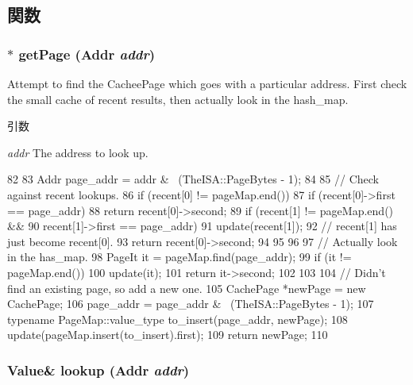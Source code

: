 \subsection{関数}
\hypertarget{classDecodeCache_1_1AddrMap_a5eb5de403aecd89f1133b26ad171f51c}{
\subsubsection[{getPage}]{$\ast$ getPage ({\bf Addr} {\em addr})}}
\label{classDecodeCache_1_1AddrMap_a5eb5de403aecd89f1133b26ad171f51c}
Attempt to find the CacheePage which goes with a particular address. First check the small cache of recent results, then actually look in the hash\_\-map. 
\begin{DoxyParams}{引数}
\item[{\em addr}]The address to look up. \end{DoxyParams}



\begin{DoxyCode}
82     {
83         Addr page_addr = addr & ~(TheISA::PageBytes - 1);
84 
85         // Check against recent lookups.
86         if (recent[0] != pageMap.end()) {
87             if (recent[0]->first == page_addr)
88                 return recent[0]->second;
89             if (recent[1] != pageMap.end() &&
90                     recent[1]->first == page_addr) {
91                 update(recent[1]);
92                 // recent[1] has just become recent[0].
93                 return recent[0]->second;
94             }
95         }
96 
97         // Actually look in the has_map.
98         PageIt it = pageMap.find(page_addr);
99         if (it != pageMap.end()) {
100             update(it);
101             return it->second;
102         }
103 
104         // Didn't find an existing page, so add a new one.
105         CachePage *newPage = new CachePage;
106         page_addr = page_addr & ~(TheISA::PageBytes - 1);
107         typename PageMap::value_type to_insert(page_addr, newPage);
108         update(pageMap.insert(to_insert).first);
109         return newPage;
110     }
\end{DoxyCode}
\hypertarget{classDecodeCache_1_1AddrMap_a758c7479d2ee5aa3d4f1e7584d30379a}{
\subsubsection[{lookup}]{\setlength{\rightskip}{0pt plus 5cm}Value\& lookup ({\bf Addr} {\em addr})}}
\label{classDecodeCache_1_1AddrMap_a758c7479d2ee5aa3d4f1e7584d30379a}



